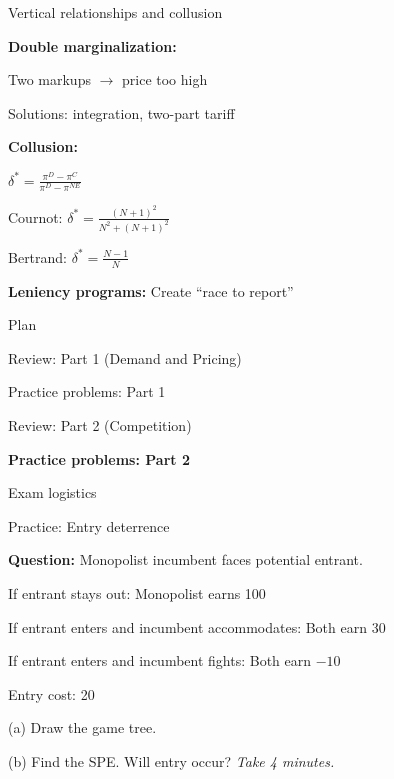 \documentclass[notes,11pt, aspectratio=169]{beamer}
\newenvironment{wideitemize}{\itemize\addtolength{\itemsep}{10pt}}{\enditemize}
\newenvironment{wideenumerate}{\enumerate\addtolength{\itemsep}{10pt}}{\endenumerate}
\begin{document}
\begin{frame}{Vertical relationships and collusion}
	\begin{wideitemize}
		\item \textbf{Double marginalization:}
		\begin{wideitemize}
			\vspace{3pt}
			\item Two markups $\rightarrow$ price too high
			\item Solutions: integration, two-part tariff
		\end{wideitemize}
		\item \textbf{Collusion:}
		\begin{wideitemize}
			\vspace{3pt}
			\item $\delta^* = \frac{\pi^D - \pi^C}{\pi^D - \pi^{NE}}$
			\item Cournot: $\delta^* = \frac{(N+1)^2}{N^2 + (N+1)^2}$
			\item Bertrand: $\delta^* = \frac{N-1}{N}$
		\end{wideitemize}
		\item \textbf{Leniency programs:} Create ``race to report''
	\end{wideitemize}
\end{frame}

\begin{frame}{Plan}
  \begin{wideenumerate}
    \item Review: Part 1 (Demand and Pricing)
    \item Practice problems: Part 1
    \item Review: Part 2 (Competition)
    \item \textbf{Practice problems: Part 2}
    \item Exam logistics
  \end{wideenumerate}
\end{frame}

\begin{frame}{Practice: Entry deterrence}
	\begin{wideitemize}
		\item \textbf{Question:} Monopolist incumbent faces potential entrant.
		\begin{wideitemize}
			\vspace{5pt}
			\item If entrant stays out: Monopolist earns 100
			\item If entrant enters and incumbent accommodates: Both earn 30
			\item If entrant enters and incumbent fights: Both earn $-10$
			\item Entry cost: 20
		\end{wideitemize}
		\item (a) Draw the game tree.
		\item (b) Find the SPE. Will entry occur?
	\end{wideitemize}
	\vspace{8pt}
	\centering
	\textit{Take 4 minutes.}
\end{frame}
\end{document}
